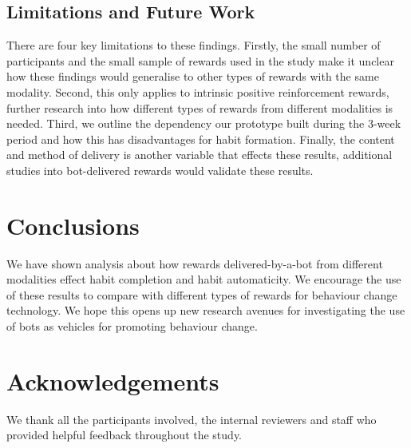 \documentclass{scaffold/sigchi}
\begin{document}
\subsection{Limitations and Future Work}
There are four key limitations to these findings. Firstly, the small number of participants and the small sample of rewards used in the study make it unclear how these findings would generalise to other types of rewards with the same modality. Second, this only applies to intrinsic positive reinforcement rewards, further research into how different types of rewards from different modalities is needed. Third, we outline the dependency our prototype built during the 3-week period and how this has disadvantages for habit formation. Finally, the content and method of delivery is another variable that effects these results, additional studies into bot-delivered rewards would validate these results. 


\section{Conclusions}

We have shown analysis about how rewards delivered-by-a-bot from different modalities effect habit completion and habit automaticity. We encourage the use of these results to compare with different types of rewards for behaviour change technology. We hope this opens up new research avenues for investigating the use of bots as vehicles for promoting behaviour change.


\section{Acknowledgements}
We thank all the participants involved, the internal reviewers and staff who provided helpful feedback throughout the study.







\end{document}

